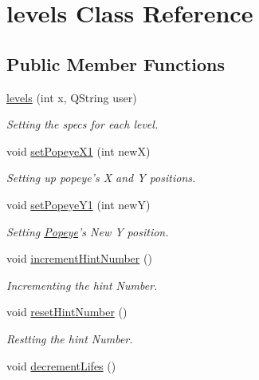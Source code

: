 \hypertarget{classlevels}{\section{levels Class Reference}
\label{classlevels}
}
\subsection*{Public Member Functions}
\begin{DoxyCompactItemize}
\item 
\hypertarget{classlevels_a9e8ec5991208108571714afff927eb6d}{\hyperlink{classlevels_a9e8ec5991208108571714afff927eb6d}{levels} (int x, Q\-String user)}\label{classlevels_a9e8ec5991208108571714afff927eb6d}

\begin{DoxyCompactList}\small\item\em Setting the specs for each level. \end{DoxyCompactList}\item 
void \hyperlink{classlevels_a7034ce39cdf8b339af99155ea4950152}{set\-Popeye\-X1} (int new\-X)
\begin{DoxyCompactList}\small\item\em Setting up popeye's X and Y positions. \end{DoxyCompactList}\item 
\hypertarget{classlevels_af6ee2e921b62c41227a4e6c602bb9305}{void \hyperlink{classlevels_af6ee2e921b62c41227a4e6c602bb9305}{set\-Popeye\-Y1} (int new\-Y)}\label{classlevels_af6ee2e921b62c41227a4e6c602bb9305}

\begin{DoxyCompactList}\small\item\em Setting \hyperlink{classPopeye}{Popeye}'s New Y position. \end{DoxyCompactList}\item 
void \hyperlink{classlevels_a1591c1aaea4c1c22bf7ef9641882e47c}{increment\-Hint\-Number} ()
\begin{DoxyCompactList}\small\item\em Incrementing the hint Number. \end{DoxyCompactList}\item 
void \hyperlink{classlevels_a676d095442c1da53bbf6dbb99c7509ae}{reset\-Hint\-Number} ()
\begin{DoxyCompactList}\small\item\em Restting the hint Number. \end{DoxyCompactList}\item 
\hypertarget{classlevels_af7799e2944f4f3cf30915976ca2ebe81}{void \hyperlink{classlevels_af7799e2944f4f3cf30915976ca2ebe81}{decrement\-Lifes} ()}\label{classlevels_af7799e2944f4f3cf30915976ca2ebe81}


\end{DoxyCompactItemize}
